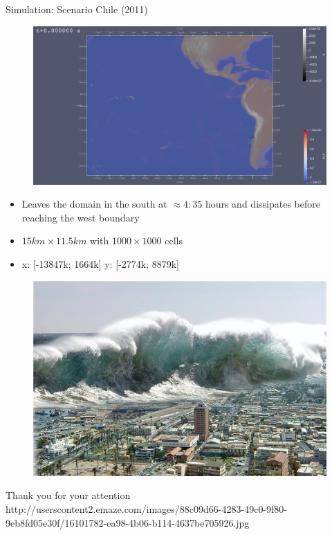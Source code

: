 \documentclass[shortpres]{beamer}
\newcommand{\imgfullscale}{0.75}
\begin{document}
\begin{frame}{Simulation: Scenario Chile (2011)}
	\begin{figure}
		\includegraphics[width=0.6\linewidth]{img/chile_initial.png}
	\end{figure}
	\begin{itemize}
		\item Leaves the domain in the south at $\approx 4:35$ hours and dissipates before reaching the west boundary
		\item $15 km \times 11.5 km$ with $1000 \times 1000$ cells
		\item x: [-13847k; 1664k] \hspace{10pt} y: [-2774k; 8879k]
	\end{itemize}
\end{frame}	
	
\begin{frame}{}
	\begin{figure}
		\includegraphics[clip, width=\imgfullscale\linewidth]{img/tsunami.jpg}
	\end{figure}
	\centering
	Thank you for your attention
	\\
	\vfill
	\flushleft
	{\fontsize{5}{5} \selectfont http://userscontent2.emaze.com/images/88c09d66-4283-49c0-9f80-9eb8fd05e30f/16101782-ea98-4b06-b114-4637be705926.jpg}
\end{frame}
\end{document}
